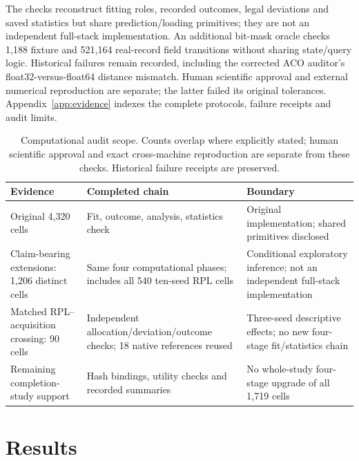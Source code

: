 \documentclass[11pt]{article}
\begin{document}
The checks reconstruct fitting roles, recorded outcomes, legal deviations
and saved statistics but share prediction/loading primitives; they are not
an independent full-stack implementation. An additional bit-mask oracle
checks 1,188 fixture and 521,164 real-record field transitions without sharing
state/query logic. Historical failures remain recorded, including the corrected
ACO auditor's float32-versus-float64 distance mismatch. Human scientific
approval and external numerical reproduction are separate; the latter failed
its original tolerances. Appendix~\ref{app:evidence} indexes the complete
protocols, failure receipts and audit limits.

\begin{table}[tbp]\centering\small
\caption{Computational audit scope. Counts overlap where explicitly stated;
human scientific approval and exact cross-machine reproduction are separate
from these checks. Historical failure receipts are preserved.}
\label{tab:audit_levels}
\begin{tabular}{>{\raggedright\arraybackslash}p{}>{\raggedright\arraybackslash}p{}>{\raggedright\arraybackslash}p{}}\toprule
Evidence & Completed chain & Boundary\\\midrule
Original 4,320 cells & Fit, outcome, analysis, statistics check & Original implementation; shared primitives disclosed\\
Claim-bearing extensions: 1,206 distinct cells & Same four computational phases; includes all 540 ten-seed RPL cells & Conditional exploratory inference; not an independent full-stack implementation\\
Matched RPL--acquisition crossing: 90 cells & Independent allocation/deviation/outcome checks; 18 native references reused & Three-seed descriptive effects; no new four-stage fit/statistics chain\\
Remaining completion-study support & Hash bindings, utility checks and recorded summaries & No whole-study four-stage upgrade of all 1,719 cells\\\bottomrule
\end{tabular}\end{table}
\section{Results}\label{sec:results}
\end{document}
